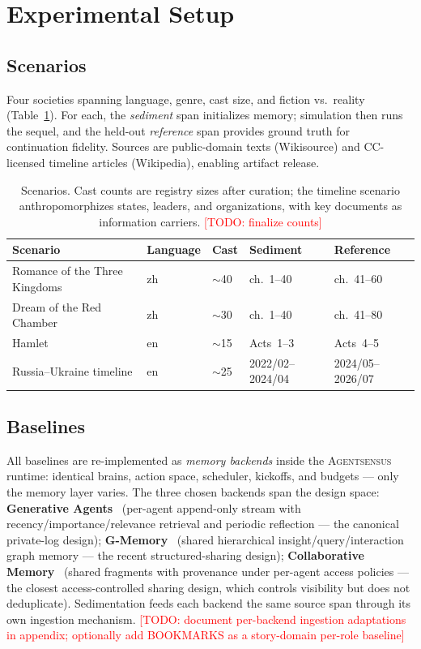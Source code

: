 \documentclass[11pt]{article}
\newcommand{\sysname}{\textsc{Agentsensus}}
\newcommand{\todo}[1]{\textcolor{red}{[TODO: #1]}}
\begin{document}
\section{Experimental Setup}
\label{sec:setup}

\subsection{Scenarios}
\label{sec:scenarios}
Four societies spanning language, genre, cast size, and fiction vs.\ reality
(Table~\ref{tab:scenarios}). For each, the \emph{sediment} span initializes
memory; simulation then runs the sequel, and the held-out \emph{reference} span
provides ground truth for continuation fidelity. Sources are public-domain
texts (Wikisource) and CC-licensed timeline articles (Wikipedia), enabling
artifact release.

\begin{table}[t]
\centering\small
\begin{tabular}{lllll}
\toprule
Scenario & Language & Cast & Sediment & Reference \\
\midrule
Romance of the Three Kingdoms & zh & $\sim$40 & ch.~1--40 & ch.~41--60 \\
Dream of the Red Chamber & zh & $\sim$30 & ch.~1--40 & ch.~41--80 \\
Hamlet & en & $\sim$15 & Acts~1--3 & Acts~4--5 \\
Russia--Ukraine timeline & en & $\sim$25 & 2022/02--2024/04 & 2024/05--2026/07 \\
\bottomrule
\end{tabular}
\caption{Scenarios. Cast counts are registry sizes after curation; the
timeline scenario anthropomorphizes states, leaders, and organizations, with
key documents as information carriers. \todo{finalize counts}}
\label{tab:scenarios}
\end{table}

\subsection{Baselines}
\label{sec:baselines}
All baselines are re-implemented as \emph{memory backends} inside the \sysname{}
runtime: identical brains, action space, scheduler, kickoffs, and budgets ---
only the memory layer varies. The three chosen backends span the design space:
\textbf{Generative Agents}~\cite{park2023generative} (per-agent append-only
stream with recency/importance/relevance retrieval and periodic reflection ---
the canonical private-log design);
\textbf{G-Memory}~\cite{gmemory2025} (shared hierarchical
insight/query/interaction graph memory --- the recent structured-sharing
design);
\textbf{Collaborative Memory}~\cite{collabmem2025} (shared fragments with
provenance under per-agent access policies --- the closest access-controlled
sharing design, which controls visibility but does not deduplicate).
Sedimentation feeds each backend the same source span through its own
ingestion mechanism. \todo{document per-backend ingestion adaptations in
appendix; optionally add BOOKMARKS as a story-domain per-role baseline}
\end{document}
